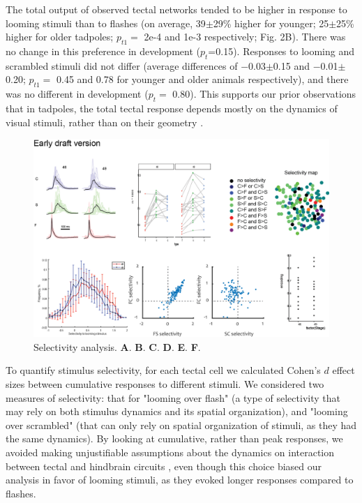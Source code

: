 \documentclass{article}
\begin{document}
The total output of observed tectal networks tended to be higher in response to looming stimuli than to flashes (on average, 39$\pm$29\% higher for younger; 25$\pm$25\% higher for older tadpoles; $p_{t1}=$ 2e-4 and 1e-3 respectively; Fig. 2B). There was no change in this preference in development ($p_t$=0.15). Responses to looming and scrambled stimuli did not differ (average differences of $-$0.03$\pm$0.15 and $-$0.01$\pm$0.20; $p_{t1}=$ 0.45 and 0.78 for younger and older animals respectively), and there was no different in development ($p_t=$ 0.80). This supports our prior observations that in tadpoles, the total tectal response depends mostly on the dynamics of visual stimuli, rather than on their geometry \citep{khakhalin2014,jang2016}.

\begin{figure}
\includegraphics[width=\linewidth]{fig2.png}
\caption{
Selectivity analysis. \textbf{A}. \textbf{B}. \textbf{C}. \textbf{D}. \textbf{E}. \textbf{F}. }
\end{figure}

To quantify stimulus selectivity, for each tectal cell we calculated Cohen’s $d$ effect sizes between cumulative responses to different stimuli. We considered two measures of selectivity: that for "looming over flash" (a type of selectivity that may rely on both stimulus dynamics and its spatial organization), and "looming over scrambled" (that can only rely on spatial organization of stimuli, as they had the same dynamics). By looking at cumulative, rather than peak responses, we avoided making unjustifiable assumptions about the dynamics on interaction between tectal and hindbrain circuits \citep{peron2009adaptation,khakhalin2014}, even though this choice biased our analysis in favor of looming stimuli, as they evoked longer responses compared to flashes. 
\end{document}
